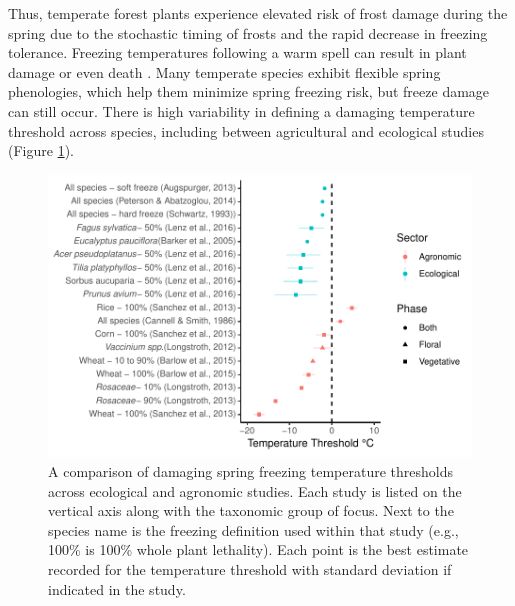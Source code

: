 \documentclass{article}\usepackage[]{graphicx}\usepackage[]{color}
\makeatletter
\def\maxwidth{ %
  \ifdim\Gin@nat@width>\linewidth
    \linewidth
  \else
    \Gin@nat@width
  \fi
}
\makeatother
\begin{document}
Thus, temperate forest plants experience elevated risk of frost damage during the spring due to the stochastic timing of frosts and the rapid decrease in freezing tolerance. Freezing temperatures following a warm spell can result in plant damage or even death \citep{Ludlum1968, Mock2007}. Many temperate species exhibit flexible spring phenologies, which help them minimize spring freezing risk, but freeze damage can still occur. There is high variability in defining a damaging temperature threshold across species, including between agricultural and ecological studies (Figure \ref{fig:temp}).

\begin{figure}[H]

{\centering \includegraphics[width=\maxwidth]{figure/temp-1} 

}

\caption[A comparison of damaging spring freezing temperature thresholds across ecological and agronomic studies]{A comparison of damaging spring freezing temperature thresholds across ecological and agronomic studies. Each study is listed on the vertical axis along with the taxonomic group of focus. Next to the species name is the freezing definition used within that study (e.g., 100\% is 100\% whole plant lethality). Each point is the best estimate recorded for the temperature threshold with standard deviation if indicated in the study.}\label{fig:temp}
\end{figure}
\end{document}
